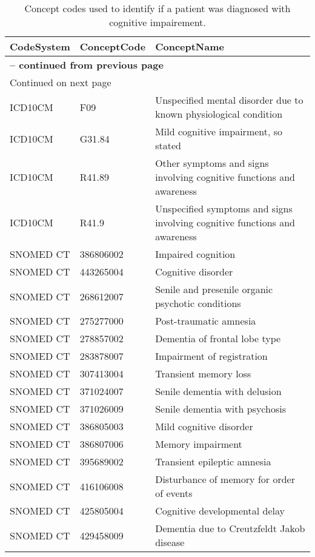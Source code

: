 \begin{longtable}{p{}p{}p{}}
\caption{Concept codes used to identify if a patient was diagnosed with cognitive impairement.} \\ 
 CodeSystem & ConceptCode & ConceptName \\ 
  \hline 
\endfirsthead 
\multicolumn{3}{p{\textwidth}}{{ \bfseries \tablename \thetable{} -- continued from previous page}} \ 
\hline CodeSystem & ConceptCode & ConceptName \\ \hline 
\endhead 
\hline \multicolumn{3}{p{\textwidth}}{{Continued on next page}} \\ \hline 
\endfoot 
\hline 
\endlastfoot 
 \hline
ICD10CM & F09 & Unspecified mental disorder due to known physiological condition \\ 
  ICD10CM & G31.84 & Mild cognitive impairment, so stated \\ 
  ICD10CM & R41.89 & Other symptoms and signs involving cognitive functions and awareness \\ 
  ICD10CM & R41.9 & Unspecified symptoms and signs involving cognitive functions and awareness \\ 
  SNOMED CT & 386806002 & Impaired cognition \\ 
  SNOMED CT & 443265004 & Cognitive disorder \\ 
  SNOMED CT & 268612007 & Senile and presenile organic psychotic conditions \\ 
  SNOMED CT & 275277000 & Post-traumatic amnesia \\ 
  SNOMED CT & 278857002 & Dementia of frontal lobe type \\ 
  SNOMED CT & 283878007 & Impairment of registration \\ 
  SNOMED CT & 307413004 & Transient memory loss \\ 
  SNOMED CT & 371024007 & Senile dementia with delusion \\ 
  SNOMED CT & 371026009 & Senile dementia with psychosis \\ 
  SNOMED CT & 386805003 & Mild cognitive disorder \\ 
  SNOMED CT & 386807006 & Memory impairment \\ 
  SNOMED CT & 395689002 & Transient epileptic amnesia \\ 
  SNOMED CT & 416106008 & Disturbance of memory for order of events \\ 
  SNOMED CT & 425805004 & Cognitive developmental delay \\ 
  SNOMED CT & 429458009 & Dementia due to Creutzfeldt Jakob disease \\ 

\end{longtable}
